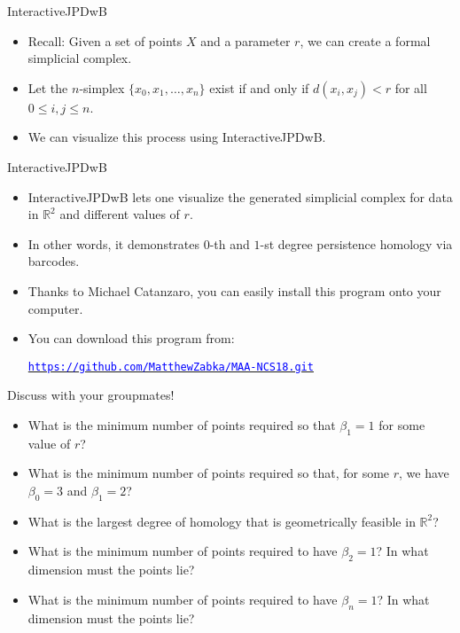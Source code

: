 \begin{frame}{InteractiveJPDwB}
\begin{itemize}
\item<1-> Recall: Given a set of points $X$ and a parameter $r$, we can create a formal simplicial complex.
\item<2-> Let the $n$-simplex $\{x_0, x_1, \ldots, x_n\}$ exist if and only if $d(x_i, x_j) < r$ for all $0 \leq i,j\leq n$. 
\item<3-> We can visualize this process using InteractiveJPDwB.
\end{itemize}
\end{frame}

\begin{frame}{InteractiveJPDwB}
\begin{itemize}
\item<1-> InteractiveJPDwB \cite{Wolcott2016InteractiveJPDwB} lets one visualize the generated simplicial complex for data in $\mathbb{R}^2$ and different values of $r$.
\item<2-> In other words, it demonstrates $0$-th and $1$-st degree persistence homology via barcodes.
\item<2-> Thanks to Michael Catanzaro, you can easily install this program onto your computer.
\item<3-> You can download this program from:
\begin{center}
\hyperref[https://github.com/MatthewZabka/MAA-NCS18.git]{\textcolor{blue}{\texttt{https://github.com/MatthewZabka/MAA-NCS18.git}}}
\end{center}
\end{itemize}
\end{frame}
\begin{frame}{Discuss with your groupmates!}
\begin{itemize}
\item What is the minimum number of points required so that $\beta_1 = 1$ for some value of $r$?
\item What is the minimum number of points required so that, for some $r$, we have $\beta_0 = 3$ and $\beta_1 = 2$?
\item What is the largest degree of homology that is geometrically feasible in $\mathbb{R}^2$?
\item What is the minimum number of points required to have $\beta_2 = 1$? In what dimension must the points lie?
\item What is the minimum number of points required to have $\beta_n = 1$?  In what dimension must the points lie?
\end{itemize}
\end{frame}
